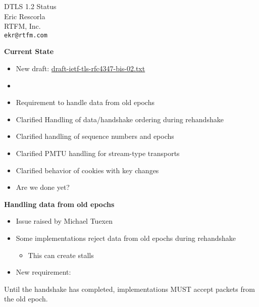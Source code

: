 \documentclass[helvetica]{seminar}
\newcommand{\heading}[1]{%
  \begin{center} 
    \large\bf 
    #1 
  \end{center} 
  \vspace{.4 in}}
\begin{document}
        
\begin{slide}
\begin{center}
\LARGE{{\bf}DTLS 1.2 Status}\\

\vspace{.3 in}
\large{Eric Rescorla}\\
\large{RTFM, Inc.}\\
\large{\texttt{ekr@rtfm.com}}
\end{center}
\end{slide}


\begin{slide}
\heading{Current State}

\begin{itemize}
\item New draft: \url{draft-ietf-tls-rfc4347-bis-02.txt}
\item[]
\item Requirement to handle data from old epochs
\item Clarified Handling of data/handshake ordering during rehandshake
\item Clarified handling of sequence numbers and epochs
\item Clarified PMTU handling for stream-type transports
\item Clarified behavior of cookies with key changes
\item Are we done yet?
\end{itemize}
\end{slide}


\begin{slide}
\heading{Handling data from old epochs}

\begin{itemize}
\item Issue raised by Michael Tuexen
\item Some implementations reject data from old epochs during rehandshake
\begin{itemize}
\item This can create stalls
\end{itemize}
\item New requirement:
\end{itemize}
Until the handshake has
completed, implementations MUST accept packets from the old epoch.
\begin{quote}

\end{quote}
\end{slide}
\end{document}
